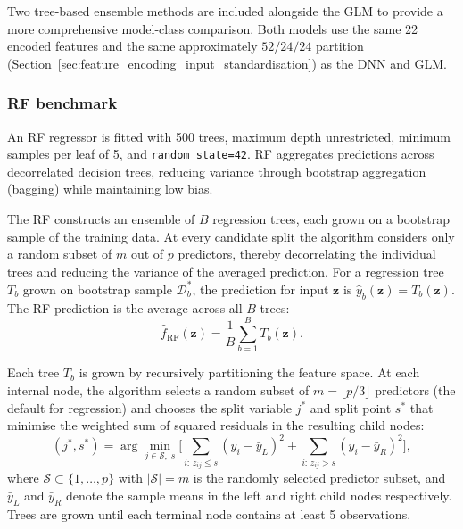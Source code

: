 Two tree-based ensemble methods are included alongside the GLM to
provide a more comprehensive model-class comparison.  Both models use the
same 22 encoded features and the same approximately $52/24/24$ partition
(Section~\ref{sec:feature_encoding_input_standardisation}) as the
DNN and GLM.


\subsubsection{RF benchmark}
An RF regressor \citep{breiman2001random} is fitted with 500 trees,
maximum depth unrestricted, minimum samples per leaf of 5, and
\texttt{random\_state=42}.  RF aggregates predictions across
decorrelated decision trees, reducing variance through bootstrap
aggregation (bagging) while maintaining low bias.

The RF constructs an ensemble of $B$ regression trees, each grown on
a bootstrap sample of the training data.  At every candidate split the
algorithm considers only a random subset of $m$ out of $p$ predictors,
thereby decorrelating the individual trees and reducing the variance of the
averaged prediction.  For a regression tree $T_b$ grown on bootstrap
sample $\mathcal{D}_b^{*}$, the prediction for input $\mathbf{z}$ is
$\hat{y}_b(\mathbf{z}) = T_b(\mathbf{z})$.  The RF prediction is
the average across all $B$ trees:
\begin{equation}
    \hat{f}_{\mathrm{RF}}(\mathbf{z})
    =
    \frac{1}{B}
    \sum_{b=1}^{B}
    T_b(\mathbf{z}).
    \label{eq:rf_prediction}
\end{equation}

Each tree $T_b$ is grown by recursively partitioning the feature space.
At each internal node, the algorithm selects a random subset of
$m = \lfloor p/3 \rfloor$ predictors (the default for regression) and
chooses the split variable $j^{*}$ and split point $s^{*}$ that minimise
the weighted sum of squared residuals in the resulting child nodes:
\begin{equation}
    (j^{*}, s^{*})
    =
    \arg\min_{j \in \mathcal{S},\; s}
    \Biggl[
        \sum_{i:\, z_{ij} \le s} (y_i - \bar{y}_{L})^{2}
        +
        \sum_{i:\, z_{ij} > s} (y_i - \bar{y}_{R})^{2}
    \Biggr],
    \label{eq:rf_split_criterion}
\end{equation}
where $\mathcal{S} \subset \{1,\dots,p\}$ with $|\mathcal{S}| = m$ is the
randomly selected predictor subset, and $\bar{y}_{L}$ and $\bar{y}_{R}$
denote the sample means in the left and right child nodes respectively.
Trees are grown until each terminal node contains at least 5 observations.

